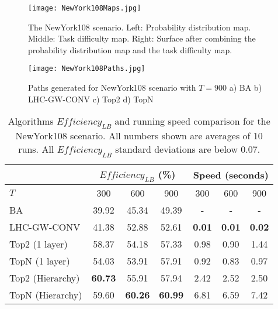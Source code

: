 \begin{figure}[!ht]
\centering
\texttt{[image: NewYork108Maps.jpg]}
\caption{The NewYork108 scenario. Left: Probability distribution map. Middle: Task difficulty map. Right: Surface after combining the probability distribution map and the task difficulty map.}
\label{NewYork108Maps}
\end{figure}
\begin{figure}[!ht]
\centering
\texttt{[image: NewYork108Paths.jpg]}
\caption{Paths generated for NewYork108 scenario with $T=900$ a) BA b) LHC-GW-CONV c) Top2 d) TopN}
\label{NewYork108Paths}
\end{figure}
\begin{table}[!ht]
\caption{Algorithms $\mathit{Efficiency_{LB}}$ and running speed comparison for the NewYork108 scenario. All numbers shown are averages of 10 runs. All $\mathit{Efficiency_{LB}}$ standard deviations are below 0.07.}
	\centering
		\begin{tabular}
			{|l|c|c|c|c|c|c|}
			\hline
			 & \multicolumn{3}{|c|}{$\mathit{Efficiency_{LB}}$ (\%)} & \multicolumn{3}{|c|}{Speed (seconds)} \\
			\hline
			$T$ & 300 & 600 & 900	& 300 & 600 & 900 \\
			\hline
			BA & 39.92 & 45.34 & 49.39 & - & - & - \\
			\hline			
			LHC-GW-CONV & 41.38 & 52.88 & 52.61 & \textbf{0.01} & \textbf{0.01} & \textbf{0.02} \\
			\hline			
			Top2 (1 layer)	& 58.37 & 54.18 & 57.33 & 0.98 & 0.90 & 1.44 \\ 
			\hline
			TopN (1 layer)	& 54.03 & 53.91 & 57.91 & 0.92 & 0.83 & 0.97 \\ 
			\hline
			Top2 (Hierarchy) & \textbf{60.73} & 55.91 & 57.94 & 2.42 & 2.52 & 2.50 \\ 
			\hline
			TopN (Hierarchy) & 59.60 & \textbf{60.26} & \textbf{60.99} & 6.81 & 6.59 & 7.42 \\ 
			\hline			
		\end{tabular}
\label{NewYork108}
\end{table}

